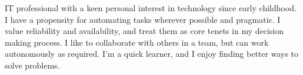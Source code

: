 \documentclass[9pt]{developercv}
\begin{document}
    \begin{minipage}[t]{0.62\textwidth}
        \vspace{-\baselineskip}
        \vspace{10pt}
        \color{gray}
        \color{navyblue}
    \end{minipage}
    \begin{minipage}[t]{0.225\textwidth}
        \vspace{-\baselineskip}


    \end{minipage}
    \begin{minipage}[t]{0.15\textwidth} %
        \vspace{-\baselineskip}

    \end{minipage}
    \vspace{0.4cm}




    \begin{minipage}[t]{1\textwidth}
        \vspace{-\baselineskip}
        IT professional with a keen personal interest in technology since early childhood.
        I have a propensity for automating tasks wherever possible and pragmatic.
        I value reliability and availability, and treat them as core tenets in my decision making process.
        I like to collaborate with others in a team, but can work autonomously as required.
        I'm a quick learner, and I enjoy finding better ways to solve problems.
    \end{minipage}

    \vspace{0.5cm}



\end{document}
